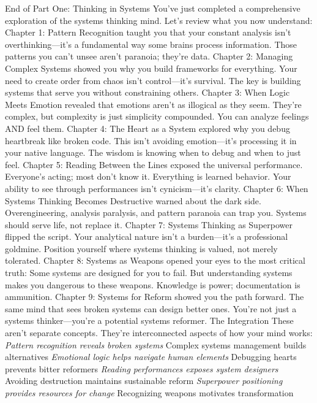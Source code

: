 \documentclass[12pt]{book}
\begin{document}
End of Part One: Thinking in Systems
You've just completed a comprehensive exploration of the systems thinking mind. Let's review what you now understand:
Chapter 1: Pattern Recognition taught you that your constant analysis isn't overthinking—it's a fundamental way some brains process information. Those patterns you can't unsee aren't paranoia; they're data.
Chapter 2: Managing Complex Systems showed you why you build frameworks for everything. Your need to create order from chaos isn't control—it's survival. The key is building systems that serve you without constraining others.
Chapter 3: When Logic Meets Emotion revealed that emotions aren't as illogical as they seem. They're complex, but complexity is just simplicity compounded. You can analyze feelings AND feel them.
Chapter 4: The Heart as a System explored why you debug heartbreak like broken code. This isn't avoiding emotion—it's processing it in your native language. The wisdom is knowing when to debug and when to just feel.
Chapter 5: Reading Between the Lines exposed the universal performance. Everyone's acting; most don't know it. Everything is learned behavior. Your ability to see through performances isn't cynicism—it's clarity.
Chapter 6: When Systems Thinking Becomes Destructive warned about the dark side. Overengineering, analysis paralysis, and pattern paranoia can trap you. Systems should serve life, not replace it.
Chapter 7: Systems Thinking as Superpower flipped the script. Your analytical nature isn't a burden—it's a professional goldmine. Position yourself where systems thinking is valued, not merely tolerated.
Chapter 8: Systems as Weapons opened your eyes to the most critical truth: Some systems are designed for you to fail. But understanding systems makes you dangerous to these weapons. Knowledge is power; documentation is ammunition.
Chapter 9: Systems for Reform showed you the path forward. The same mind that sees broken systems can design better ones. You're not just a systems thinker—you're a potential systems reformer.
The Integration
These aren't separate concepts. They're interconnected aspects of how your mind works:
\textit{ Pattern recognition reveals broken systems
} Complex systems management builds alternatives
\textit{ Emotional logic helps navigate human elements
} Debugging hearts prevents bitter reformers
\textit{ Reading performances exposes system designers
} Avoiding destruction maintains sustainable reform
\textit{ Superpower positioning provides resources for change
} Recognizing weapons motivates transformation
\end{document}
